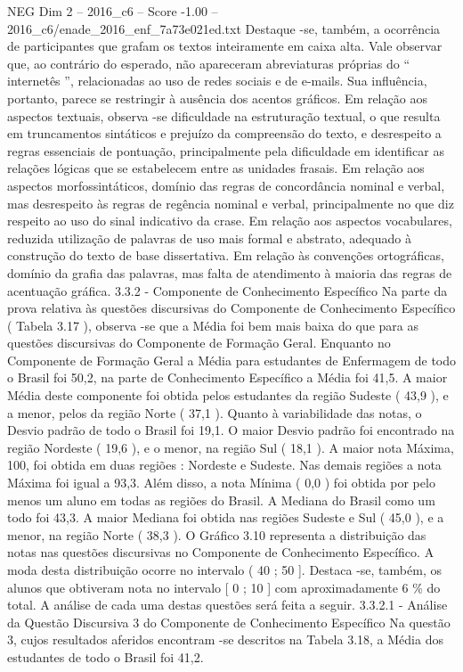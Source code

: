 \begin{textsample}{NEG Dim 2 – 2016\_c6 – Score -1.00 – 2016\_c6/enade\_2016\_enf\_7a73e021ed.txt}
Destaque -se, também, a ocorrência de participantes que grafam os textos inteiramente em caixa alta.
Vale observar que, ao contrário do esperado, não apareceram abreviaturas próprias do “ internetês ”, relacionadas ao uso de redes sociais e de e-mails.
Sua influência, portanto, parece se restringir à ausência dos acentos gráficos.
Em relação aos aspectos textuais, observa -se dificuldade na estruturação textual, o que resulta em truncamentos sintáticos e prejuízo da compreensão do texto, e desrespeito a regras essenciais de pontuação, principalmente pela dificuldade em identificar as relações lógicas que se estabelecem entre as unidades frasais.
Em relação aos aspectos morfossintáticos, domínio das regras de concordância nominal e verbal, mas desrespeito às regras de regência nominal e verbal, principalmente no que diz respeito ao uso do sinal indicativo da crase.
Em relação aos aspectos vocabulares, reduzida utilização de palavras de uso mais formal e abstrato, adequado à construção do texto de base dissertativa.
Em relação às convenções ortográficas, domínio da grafia das palavras, mas falta de atendimento à maioria das regras de acentuação gráfica. 3.3.2 - Componente de Conhecimento Específico Na parte da prova relativa às questões discursivas do Componente de Conhecimento Específico ( Tabela 3.17 ), observa -se que a Média foi bem mais baixa do que para as questões discursivas do Componente de Formação Geral.
Enquanto no Componente de Formação Geral a Média para estudantes de Enfermagem de todo o Brasil foi 50,2, na parte de Conhecimento Específico a Média foi 41,5.
A maior Média deste componente foi obtida pelos estudantes da região Sudeste ( 43,9 ), e a menor, pelos da região Norte ( 37,1 ).
Quanto à variabilidade das notas, o Desvio padrão de todo o Brasil foi 19,1.
O maior Desvio padrão foi encontrado na região Nordeste ( 19,6 ), e o menor, na região Sul ( 18,1 ).
A maior nota Máxima, 100, foi obtida em duas regiões : Nordeste e Sudeste.
Nas demais regiões a nota Máxima foi igual a 93,3.
Além disso, a nota Mínima ( 0,0 ) foi obtida por pelo menos um aluno em todas as regiões do Brasil.
A Mediana do Brasil como um todo foi 43,3.
A maior Mediana foi obtida nas regiões Sudeste e Sul ( 45,0 ), e a menor, na região Norte ( 38,3 ).
O Gráfico 3.10 representa a distribuição das notas nas questões discursivas no Componente de Conhecimento Específico.
A moda desta distribuição ocorre no intervalo ( 40 ; 50 ].
Destaca -se, também, os alunos que obtiveram nota no intervalo [ 0 ; 10 ] com aproximadamente 6 \% do total.
A análise de cada uma destas questões será feita a seguir. 3.3.2.1 - Análise da Questão Discursiva 3 do Componente de Conhecimento Específico Na questão 3, cujos resultados aferidos encontram -se descritos na Tabela 3.18, a Média dos estudantes de todo o Brasil foi 41,2.

\end{textsample}
